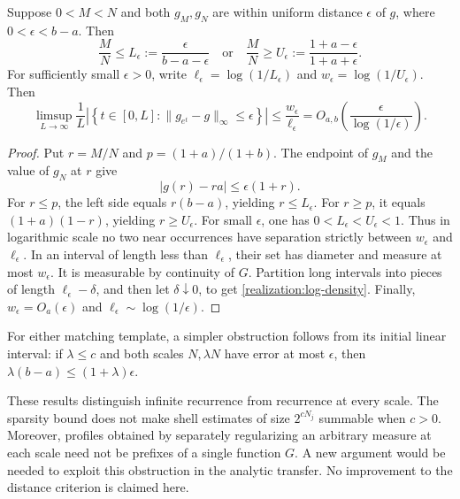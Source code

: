 \begin{proposition}
\label{realization:sparsity}
Suppose \(0<M<N\) and both \(g_M,g_N\) are within uniform distance
\(\epsilon\) of \(g\), where \(0<\epsilon<b-a\). Then
\[
 \frac MN\le L_\epsilon:=\frac{\epsilon}{b-a-\epsilon}
 \quad\text{or}\quad
 \frac MN\ge U_\epsilon:=\frac{1+a-\epsilon}{1+a+\epsilon}.
\]
For sufficiently small \(\epsilon>0\), write
\(\ell_\epsilon=\log(1/L_\epsilon)\) and
\(w_\epsilon=\log(1/U_\epsilon)\). Then
\begin{equation}\label{realization:log-density}
 \limsup_{L\to\infty}\frac1L
 \left|\left\{t\in[0,L]:\|g_{e^t}-g\|_\infty\le\epsilon\right\}\right|
 \le\frac{w_\epsilon}{\ell_\epsilon}
 =O_{a,b}\!\left(\frac{\epsilon}{\log(1/\epsilon)}\right).
\end{equation}
\end{proposition}
\begin{proof}
Put \(r=M/N\) and \(p=(1+a)/(1+b)\). The endpoint of \(g_M\)
and the value of \(g_N\) at \(r\) give
\[
 |g(r)-ra|\le\epsilon(1+r).
\]
For \(r\le p\), the left side equals \(r(b-a)\), yielding
\(r\le L_\epsilon\). For \(r\ge p\), it equals
\((1+a)(1-r)\), yielding \(r\ge U_\epsilon\).
For small \(\epsilon\), one has \(0<L_\epsilon<U_\epsilon<1\).
Thus in logarithmic scale no two near occurrences have separation strictly
between \(w_\epsilon\) and \(\ell_\epsilon\). In an interval of
length less than \(\ell_\epsilon\), their set has diameter and measure
at most \(w_\epsilon\). It is measurable by continuity of \(G\).
Partition long intervals into pieces of length
\(\ell_\epsilon-\delta\), and then let \(\delta\downarrow0\), to get
\eqref{realization:log-density}. Finally,
\(w_\epsilon=O_a(\epsilon)\) and
\(\ell_\epsilon\sim\log(1/\epsilon)\).
\end{proof}

For either matching template, a simpler obstruction follows from its initial
linear interval: if \(\lambda\le c\) and both scales \(N,\lambda N\)
have error at most \(\epsilon\), then
\(\lambda(b-a)\le(1+\lambda)\epsilon\).

These results distinguish infinite recurrence from recurrence at every scale.
The sparsity bound does not make shell estimates of size \(2^{cN_j}\)
summable when \(c>0\). Moreover, profiles obtained by separately regularizing
an arbitrary measure at each scale need not be prefixes of a single function
\(G\). A new argument would be needed to exploit this obstruction in the
analytic transfer. No improvement to the distance criterion is claimed here.

